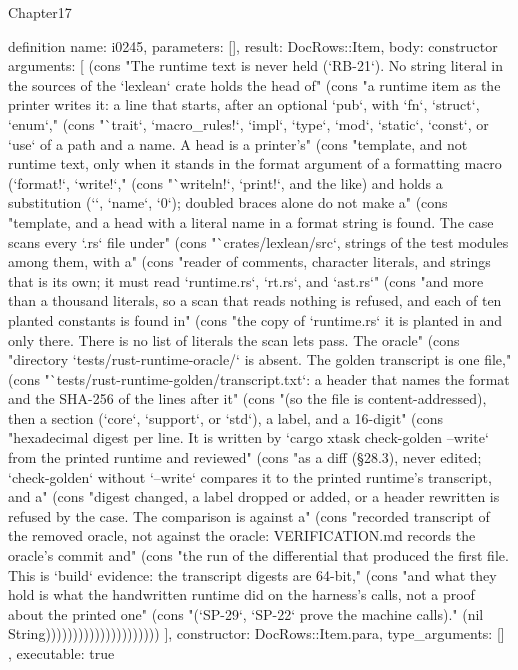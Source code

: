 \begin{lexlean}{Chapter17}
\begin{semanticmodule}
definition{
  name: i0245,
  parameters: [],
  result: DocRows::Item,
  body: constructor{
    arguments: [
      (cons "The runtime text is never held (`RB-21`). No string literal in the sources of the `lexlean` crate holds the head of" (cons "a runtime item as the printer writes it: a line that starts, after an optional `pub`, with `fn`, `struct`, `enum`," (cons "`trait`, `macro_rules!`, `impl`, `type`, `mod`, `static`, `const`, or `use` of a path and a name. A head is a printer's" (cons "template, and not runtime text, only when it stands in the format argument of a formatting macro (`format!`, `write!`," (cons "`writeln!`, `print!`, and the like) and holds a substitution (`{}`, `{name}`, `{0}`); doubled braces alone do not make a" (cons "template, and a head with a literal name in a format string is found. The case scans every `.rs` file under" (cons "`crates/lexlean/src`, strings of the test modules among them, with a" (cons "reader of comments, character literals, and strings that is its own; it must read `runtime.rs`, `rt.rs`, and `ast.rs`" (cons "and more than a thousand literals, so a scan that reads nothing is refused, and each of ten planted constants is found in" (cons "the copy of `runtime.rs` it is planted in and only there. There is no list of literals the scan lets pass. The oracle" (cons "directory `tests/rust-runtime-oracle/` is absent. The golden transcript is one file," (cons "`tests/rust-runtime-golden/transcript.txt`: a header that names the format and the SHA-256 of the lines after it" (cons "(so the file is content-addressed), then a section (`core`, `support`, or `std`), a label, and a 16-digit" (cons "hexadecimal digest per line. It is written by `cargo xtask check-golden --write` from the printed runtime and reviewed" (cons "as a diff (§28.3), never edited; `check-golden` without `--write` compares it to the printed runtime's transcript, and a" (cons "digest changed, a label dropped or added, or a header rewritten is refused by the case. The comparison is against a" (cons "recorded transcript of the removed oracle, not against the oracle: VERIFICATION.md records the oracle's commit and" (cons "the run of the differential that produced the first file. This is `build` evidence: the transcript digests are 64-bit," (cons "and what they hold is what the handwritten runtime did on the harness's calls, not a proof about the printed one" (cons "(`SP-29`, `SP-22` prove the machine calls)." (nil String)))))))))))))))))))))
    ],
    constructor: DocRows::Item.para,
    type_arguments: []
  },
  executable: true
}


\end{semanticmodule}
\end{lexlean}
